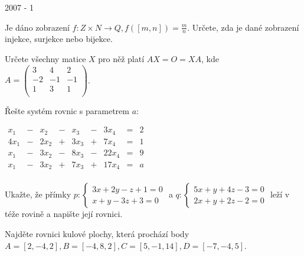 
\newpage
{\large 2007 - 1}

\begin{questions}

\question Je dáno zobrazení \(f: Z \times N \rightarrow Q, f([m,n]) = \frac{m}{n}\). Určete, zda je dané zobrazení injekce, surjekce nebo bijekce.

\question Určete všechny matice \(X\) pro něž platí \(AX = O = XA\), kde \(A = \begin{pmatrix}
    3 & 4 & 2\\
    -2 & -1 & -1\\
    1 & 3 & 1\\
\end{pmatrix}\).

\newpage
\question Řešte systém rovnic s parametrem \(a\): \begin{center}
    \(\begin{matrix}
         x_1 & - &  x_2 & - &  x_3 & - &  3x_4 & = & 2 \\
        4x_1 & - & 2x_2 & + & 3x_3 & + &  7x_4 & = & 1 \\
         x_1 & - & 3x_2 & - & 8x_3 & - & 22x_4 & = & 9 \\
         x_1 & - & 3x_2 & + & 7x_3 & + & 17x_4 & = & a \\
    \end{matrix}\)
\end{center}

\question Ukažte, že přímky \(p: \left\{
    \begin{array}{l}
        3x + 2y - z + 1 = 0\\
        x + y - 3z + 3 = 0
    \end{array}
\right.\) a \(q: \left\{
    \begin{array}{l}
        5x + y + 4z - 3 = 0\\
        2x + y + 2z - 2 = 0
    \end{array}
\right.\) leží v téže rovině a napište její rovnici.

\newpage
\question Najděte rovnici kulové plochy, která prochází body \(A = [2, -4,2], B = [-4, 8, 2], C = [5, -1, 14], D = [-7, -4, 5]\).

\end{questions}

